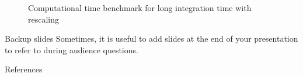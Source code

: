 \documentclass{beamer}
\begin{document}

\begin{frame}
	\begin{figure}
		
		\caption{Computational time benchmark for long integration time with rescaling}
	\end{figure}
\end{frame}


\begin{frame}[fragile]{Backup slides}
  Sometimes, it is useful to add slides at the end of your presentation to
  refer to during audience questions.


\end{frame}

\begin{frame}[allowframebreaks]{References}

  
  

\end{frame}
\end{document}
